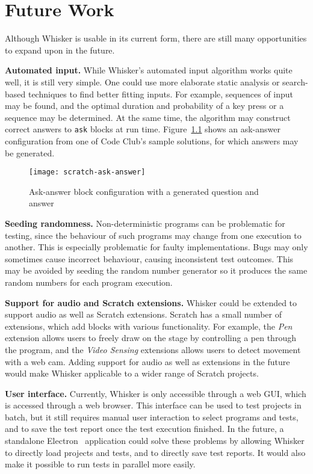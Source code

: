 \chapter{Future Work}
\label{cha:future_work}

Although Whisker is usable in its current form,
there are still many opportunities to expand upon in the future.
\parspace

\textbf{Automated input.}
While Whisker's automated input algorithm works quite well, it is still very simple.
One could use more elaborate static analysis or search-based techniques to find better fitting inputs.
For example, sequences of input may be found, and the optimal duration and probability of a key press or a sequence may be determined.
At the same time, the algorithm may construct correct answers to \texttt{ask} blocks at run time.
Figure~\ref{fig:generated_ask_answer} shows an ask-answer configuration from one of Code Club's sample solutions,
for which answers may be generated.

\begin{figure}[htpb]
    \centering
    \texttt{[image: scratch-ask-answer]}
    \caption{Ask-answer block configuration with a generated question and answer}
    \label{fig:generated_ask_answer}
\end{figure}

\textbf{Seeding randomness.}
Non-deterministic programs can be problematic for testing,
since the behaviour of such programs may change from one execution to another.
This is especially problematic for faulty implementations.
Bugs may only sometimes cause incorrect behaviour, causing inconsistent test outcomes.
This may be avoided by seeding the random number generator so it produces the same random numbers for each program execution.
\parspace

\textbf{Support for audio and Scratch extensions.}
Whisker could be extended to support audio as well as Scratch extensions.
Scratch has a small number of extensions, which add blocks with various functionality.
For example, the \textit{Pen} extension allows users to freely draw on the stage by controlling a pen through the program,
and the \textit{Video Sensing} extensions allows users to detect movement with a web cam.
Adding support for audio as well as extensions in the future would make Whisker applicable to a wider range of Scratch projects.
\parspace

\textbf{User interface.}
Currently, Whisker is only accessible through a web GUI, which is accessed through a web browser.
This interface can be used to test projects in batch, but it still requires manual user interaction to select programs and tests,
and to save the test report once the test execution finished.
In the future, a standalone Electron~\cite{electron} application could solve these problems by allowing Whisker to directly load projects and tests,
and to directly save test reports.
It would also make it possible to run tests in parallel more easily.
\parspace

